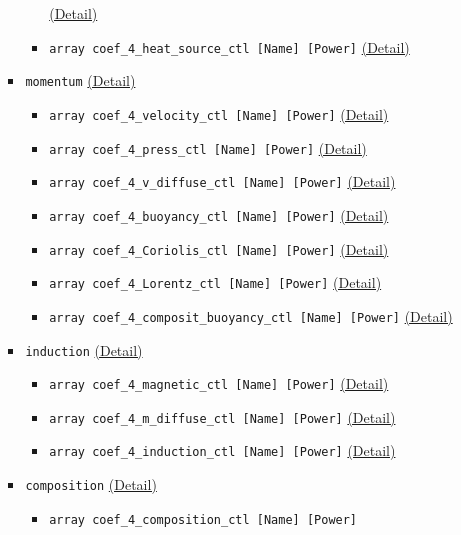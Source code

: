 \begin{itemize}
\begin{itemize}
\begin{itemize}
\begin{itemize}
		    		\hyperref[href_t:coef_4_t_diffuse_ctl]{(Detail)}
			\item \verb|array coef_4_heat_source_ctl [Name] [Power]|
		    		\hyperref[href_t:coef_4_heat_source_ctl]{(Detail)}
			\end{itemize}
%
		\item \verb|momentum|
			\label{href_i:momentum}
	    		\hyperref[href_t:momentum]{(Detail)}
			\begin{itemize}
			\item \verb|array coef_4_velocity_ctl [Name] [Power]|
		    		\hyperref[href_t:coef_4_velocity_ctl]{(Detail)}
			\item \verb|array coef_4_press_ctl [Name] [Power]|
		    		\hyperref[href_t:coef_4_press_ctl]{(Detail)}
			\item \verb|array coef_4_v_diffuse_ctl [Name] [Power]|
		    		\hyperref[href_t:coef_4_v_diffuse_ctl]{(Detail)}
			\item \verb|array coef_4_buoyancy_ctl [Name] [Power]|
		    		\hyperref[href_t:coef_4_buoyancy_ctl]{(Detail)}
			\item \verb|array coef_4_Coriolis_ctl [Name] [Power]|
		    		\hyperref[href_t:coef_4_Coriolis_ctl]{(Detail)}
			\item \verb|array coef_4_Lorentz_ctl [Name] [Power]|
		    		\hyperref[href_t:coef_4_Lorentz_ctl]{(Detail)}
			\item \verb|array coef_4_composit_buoyancy_ctl [Name] [Power]|
		    		\hyperref[href_t:coef_4_composit_buoyancy_ctl]{(Detail)}
			\end{itemize}
%
		\item \verb|induction|
			\label{href_i:induction}
	    		\hyperref[href_t:induction]{(Detail)}
			\begin{itemize}
			\item \verb|array coef_4_magnetic_ctl [Name] [Power]|
		    		\hyperref[href_t:coef_4_magnetic_ctl]{(Detail)}
			\item \verb|array coef_4_m_diffuse_ctl [Name] [Power]|
		    		\hyperref[href_t:coef_4_m_diffuse_ctl]{(Detail)}
			\item \verb|array coef_4_induction_ctl [Name] [Power]|
		    		\hyperref[href_t:coef_4_induction_ctl]{(Detail)}
			\end{itemize}
%
		\item \verb|composition|
			\label{href_i:composition}
	    		\hyperref[href_t:composition]{(Detail)}
			\begin{itemize}
			\item \verb|array coef_4_composition_ctl [Name] [Power]|

\end{itemize}
\end{itemize}
\end{itemize}
\end{itemize}
